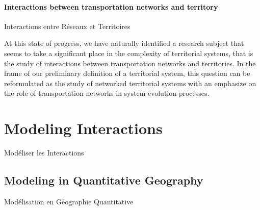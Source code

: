 \paragraph{Interactions between transportation networks and territory}{Interactions entre Réseaux et Territoires}

At this state of progress, we have naturally identified a research subject that seems to take a significant place in the complexity of territorial systems, that is the study of interactions between transportation networks and territories. In the frame of our preliminary definition of a territorial system, this question can be reformulated as the study of networked territorial systems with an emphasize on the role of transportation networks in system evolution processes.





\newpage

\section{Modeling Interactions}{Modéliser les Interactions}


\subsection{Modeling in Quantitative Geography}{Modélisation en Géographie Quantitative}




